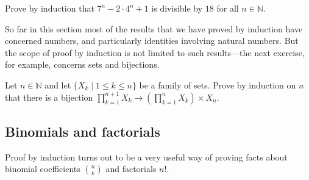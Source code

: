 \begin{exercise}
Prove by induction that $7^n - 2 \cdot 4^n + 1$ is divisible by $18$ for all $n \in \mathbb{N}$.
\end{exercise}

So far in this section most of the results that we have proved by induction have concerned numbers, and particularly identities involving natural numbers. But the scope of proof by induction is not limited to such results---the next exercise, for example, concerns sets and bijections.

\begin{exercise}
Let $n \in \mathbb{N}$ and let $\{ X_k \mid 1 \le k \le n \}$ be a family of sets. Prove by induction on $n$ that there is a bijection $\displaystyle \prod_{k=1}^{n+1} X_k \to \left( \prod_{k=1}^n X_k \right) \times X_n$.
\end{exercise}

\subsection*{Binomials and factorials}

Proof by induction turns out to be a very useful way of proving facts about binomial coefficients $\binom{n}{k}$ and factorials $n!$.

